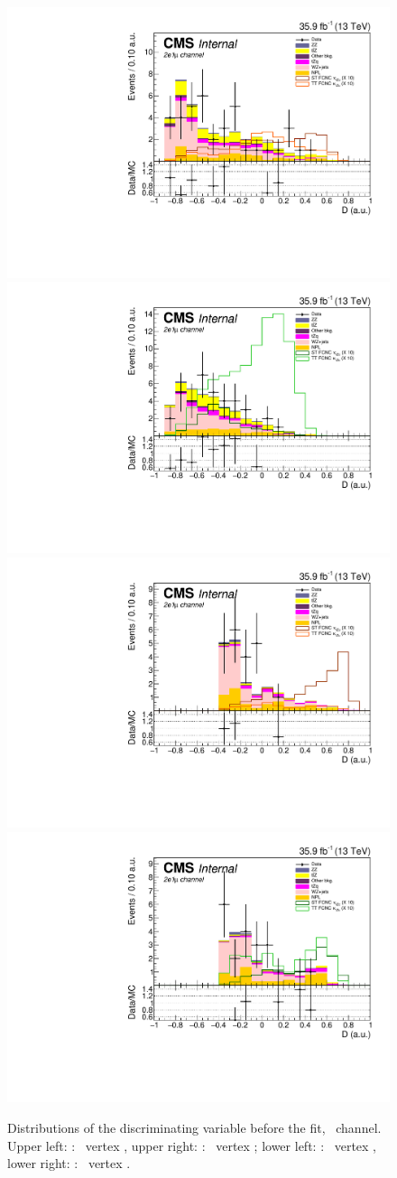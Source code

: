 \begin{figure}[ht]
	\centering
	\includegraphics[width=0.39\linewidth]{6_Search/Figures/BDTdistributions/toppair_Zut_BDT_eeu_Stack}
	\includegraphics[width=0.39\linewidth]{6_Search/Figures/BDTdistributions/toppair_Zct_BDT_eeu_Stack}
	\includegraphics[width=0.39\linewidth]{6_Search/Figures/BDTdistributions/singletop_Zut_BDT_eeu_Stack}
	\includegraphics[width=0.39\linewidth]{6_Search/Figures/BDTdistributions/singletop_Zct_BDT_eeu_Stack}
	\caption{Distributions of the discriminating variable before the fit, \eemu\  channel. Upper left: \TTSR: \Zut\ vertex , upper right: \TTSR: \Zct\ vertex ; lower left: \STSR: \Zut\ vertex , lower right: \STSR: \Zct\ vertex .}
	\label{fig:bdteeustack}
\end{figure}



